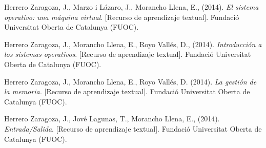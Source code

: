 \documentclass[spanish]{article}
\begin{document}
\begin{thebibliography}{X}

\item Herrero Zaragoza, J., Marzo i Lázaro, J., Morancho
Llena, E., (2014). \textit{El sistema operativo: una máquina
virtual}. [Recurso de aprendizaje textual]. Fundació
Universitat Oberta de Catalunya (FUOC).

\item Herrero Zaragoza, J., Morancho Llena, E., Royo Vallés,
D., (2014). \textit{Introducción a los sistemas operativos}.
[Recurso de aprendizaje textual]. Fundació Universitat
Oberta de Catalunya (FUOC).

\item Herrero Zaragoza, J., Morancho Llena, E., Royo Vallés,
D. (2014). \textit{La gestión de la memoria.} [Recurso de
aprendizaje textual]. Fundació Universitat Oberta de
Catalunya (FUOC).

\item Herrero Zaragoza, J., Jové Lagunas, T., Morancho
Llena, E., (2014). \textit{Entrada/Salida}. [Recurso de
aprendizaje textual]. Fundació Universitat Oberta de
Catalunya (FUOC).

\end{thebibliography}
\end{document}
